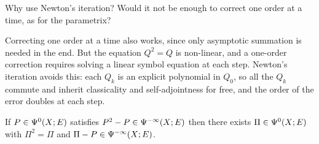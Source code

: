 \begin{question}
Why use Newton's iteration? Would it not be enough to correct one order at a
time, as for the parametrix?
\end{question}
\begin{answer}
Correcting one order at a time also works, since only asymptotic summation is
needed in the end. But the equation $Q^2=Q$ is non-linear, and a one-order
correction requires solving a linear symbol equation at each step. Newton's
iteration avoids this: each $Q_k$ is an explicit polynomial in $Q_0$, so all
the $Q_k$ commute and inherit classicality and self-adjointness for free, and
the order of the error doubles at each step.
\end{answer}

\begin{proposition}\label{manifolds:prop:projection}
If $P\in\Psi^{0}(X;E)$ satisfies $P^2-P\in\Psi^{-\infty}(X;E)$ then there exists
$\Pi\in\Psi^{0}(X;E)$ with $\Pi^2=\Pi$ and $\Pi-P\in\Psi^{-\infty}(X;E)$.
\end{proposition}
